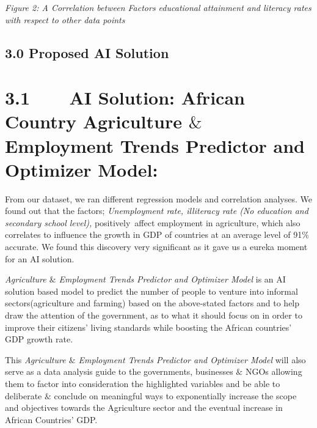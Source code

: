 \documentclass[12pt]{article}
\renewcommand{\_}{\kern-1.5pt\textunderscore\kern-1.5pt}
\begin{document}


\vspace{\baselineskip}
\vspace{\baselineskip}
\begin{justify}
{\fontsize{8pt}{9.6pt}\selectfont \textit{Figure 2: A Correlation between Factors educational attainment and literacy rates with respect to other data points}\par}
\end{justify}
\section*{3.0 Proposed AI Solution}
\chapter{3.1\ \ \ \ AI Solution:  African Country Agriculture $\&$  Employment Trends Predictor and Optimizer Model:}
\begin{justify}
{\fontsize{9pt}{10.8pt}\selectfont From our dataset, we ran different regression models and correlation analyses. We found out that the factors; \textit{Unemployment rate, illiteracy rate (No education and secondary school level), }positively\ affect employment in agriculture, which also correlates to influence the growth in  GDP of countries at an average level of 91$\%$  accurate. We found this discovery very significant as it gave us a eureka moment for an AI solution.\par}
\end{justify}
\begin{justify}
{\fontsize{9pt}{10.8pt}\selectfont  }
\end{justify}
\begin{justify}
{\fontsize{9pt}{10.8pt}\selectfont \textit{Agriculture $\&$  Employment Trends Predictor and Optimizer Model} is an AI solution based model to predict the number of people to venture into informal sectors(agriculture and farming) based on the above-stated factors and to help draw the attention of the government, as to what it should focus on in order to improve their citizens’ living standards while boosting the African countries’ GDP growth rate.\par}
\end{justify}
\begin{justify}
{\fontsize{9pt}{10.8pt}\selectfont  }
\end{justify}
\begin{justify}
{\fontsize{9pt}{10.8pt}\selectfont This \textit{Agriculture $\&$  Employment Trends Predictor and Optimizer Model} will also serve as a data analysis guide to the governments, businesses $\&$  NGOs allowing them to factor into consideration the highlighted variables and be able to deliberate $\&$  conclude on meaningful ways to exponentially increase the scope and objectives towards the Agriculture sector and the eventual increase in African Countries’ GDP.\par}
\end{justify}
\end{document}
